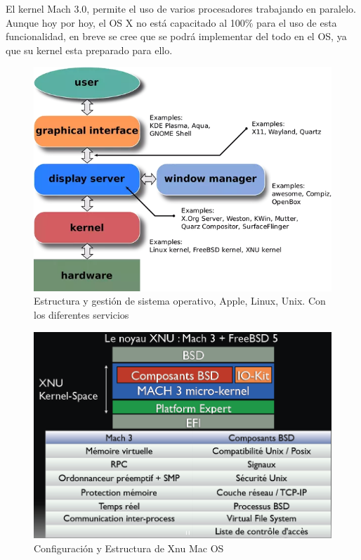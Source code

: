 \documentclass[paper=a4, fontsize=12pt]{article} 		%
\numberwithin{equation}{section}						%
\numberwithin{table}{section} 							%
\begin{document}
El kernel Mach 3.0, permite el uso de varios procesadores trabajando en paralelo. Aunque hoy por hoy, el OS X no está capacitado al 100\% para el uso de esta funcionalidad, en breve se cree que se podrá implementar del todo en el OS, ya que su kernel esta preparado para ello.

\begin{center}
\begin{figure}[H]
\includegraphics[scale=0.4]{img/main.jpg}
\caption{Estructura y gestión de sistema operativo, Apple, Linux, Unix. Con los diferentes servicios}
\label{fig:io}
\end{figure}
\end{center} 
\begin{center}
\begin{figure}[H]
\includegraphics[scale=0.4]{img/xnu.png}
\caption{Configuración y Estructura de Xnu Mac OS}
\label{fig:dis2}
\end{figure}
\end{center}
\end{document}
